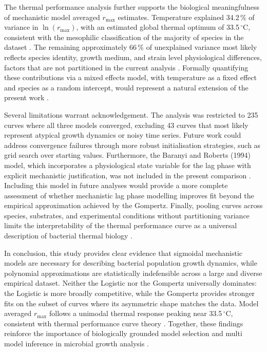 \documentclass[11pt,a4paper]{article}
\begin{document}
The thermal performance analysis further supports the biological
meaningfulness of mechanistic model averaged $r_{\max}$ estimates.
Temperature explained 34.2\,\% of variance in $\ln(r_{\max})$, with an
estimated global thermal optimum of 33.5\,$^\circ$C, consistent with the
mesophilic classification of the majority of species in the dataset
\citep{madigan2018}. The remaining approximately 66\,\% of unexplained
variance most likely reflects species identity, growth medium, and
strain level physiological differences, factors that are not partitioned
in the current analysis \citep{brown2004}. Formally quantifying these
contributions via a mixed effects model, with temperature as a fixed
effect and species as a random intercept, would represent a natural
extension of the present work \citep{Zuur2009}.

Several limitations warrant acknowledgement. The analysis was restricted
to 235 curves where all three models converged, excluding 43 curves that
most likely represent atypical growth dynamics or noisy time series.
Future work could address convergence failures through more robust
initialisation strategies, such as grid search over starting values.
Furthermore, the Baranyi and Roberts (1994) model, which incorporates
a physiological state variable for the lag phase with explicit mechanistic
justification, was not included in the present comparison
\citep{baranyi1994}. Including this model in future analyses would provide
a more complete assessment of whether mechanistic lag phase modelling
improves fit beyond the empirical approximation achieved by the Gompertz.
Finally, pooling curves across species, substrates, and experimental
conditions without partitioning variance limits the interpretability of
the thermal performance curve as a universal description of bacterial
thermal biology \citep{angilletta2009}.

In conclusion, this study provides clear evidence that sigmoidal
mechanistic models are necessary for describing bacterial population
growth dynamics, while polynomial approximations are statistically
indefensible across a large and diverse empirical dataset. Neither the
Logistic nor the Gompertz universally dominates: the Logistic is more
broadly competitive, while the Gompertz provides stronger fits on the
subset of curves where its asymmetric shape matches the data.
Model averaged $r_{\max}$ follows a unimodal thermal response peaking
near 33.5\,$^\circ$C, consistent with thermal performance curve theory
\citep{angilletta2009}. Together, these findings reinforce the importance
of biologically grounded model selection and multi model inference in
microbial growth analysis \citep{burnham2002}.

\newpage


\end{document}
